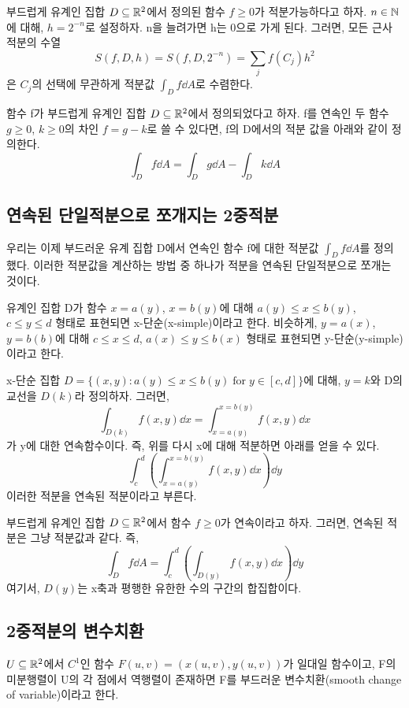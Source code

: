 \begin{theorem}
부드럽게 유계인 집합 $D\subseteq\mathbb{R}^2$에서 정의된 함수 $f\ge 0$가 적분가능하다고 하자. $n\in\mathbb{N}$에 대해, $h=2^{-n}$로 설정하자. n을 늘려가면 h는 0으로 가게 된다. 그러면, 모든 근사 적분의 수열
$$
S(f,D,h)=S(f,D,2^{-n})=\sum_jf(C_j)h^2
$$
은 $C_j$의 선택에 무관하게 적분값 $\int_Df\dd A$로 수렴한다.
\end{theorem}
\begin{definition}
함수 f가 부드럽게 유계인 집합 $D\subseteq\mathbb{R}^2$에서 정의되었다고 하자. f를 연속인 두 함수 $g\ge 0$, $k\ge 0$의 차인 $f=g-k$로 쓸 수 있다면, f의 D에서의 적분 값을 아래와 같이 정의한다.
$$
\int_Df\dd A = \int_Dg\dd A - \int_Dk\dd A
$$
\end{definition}

\subsection{연속된 단일적분으로 쪼개지는 2중적분}
우리는 이제 부드러운 유계 집합 D에서 연속인 함수 f에 대한 적분값 $\int_Df\dd A$를 정의했다. 이러한 적분값을  계산하는 방법 중 하나가 적분을 연속된 단일적분으로 쪼개는 것이다.
\begin{definition}[단순 집합]
유계인 집합 D가 함수 $x=a(y)$, $x=b(y)$에 대해 $a(y)\le x\le b(y)$, $c\le y\le d$ 형태로 표현되면 x-단순(x-simple)이라고 한다. 비슷하게, $y=a(x)$, $y=b(b)$에 대해 $c\le x\le d$, $a(x)\le y\le b(x)$ 형태로 표현되면 y-단순(y-simple)이라고 한다.
\end{definition}
x-단순 집합 $D = \{(x,y):a(y)\le x\le b(y)\;\text{for}\; y \in [c,d]\}$에 대해, $y=k$와 D의 교선을 $D(k)$라 정의하자. 그러면,
$$
\int_{D(k)}f(x,y)\dd x = \int_{x=a(y)}^{x=b(y)}f(x,y)\dd x
$$
가 y에 대한 연속함수이다. 즉, 위를 다시 x에 대해 적분하면 아래를 얻을 수 있다.
$$
\int_c^d \left(\int_{x=a(y)}^{x=b(y)}f(x,y)\dd x\right) \dd y
$$
이러한 적분을 연속된 적분이라고 부른다.
\begin{theorem}
부드럽게 유계인 집합 $D\subseteq\mathbb{R}^2$에서 함수 $f\ge 0$가 연속이라고 하자. 그러면, 연속된 적분은 그냥 적분값과 같다. 즉,
$$
\int_Df\dd A=\int_c^d \left(\int_{D(y)}f(x,y)\dd x\right) \dd y
$$
여기서, $D(y)$는 x축과 평행한 유한한 수의 구간의 합집합이다.
\end{theorem}

\subsection{2중적분의 변수치환}
\begin{definition}
$U\subseteq\mathbb{R}^2$에서 $C^1$인 함수 $F(u,v)=(x(u,v),y(u,v))$가 일대일 함수이고, F의 미분행렬이 U의 각 점에서 역행렬이 존재하면 F를 부드러운 변수치환(smooth change of variable)이라고 한다.
\end{definition}

